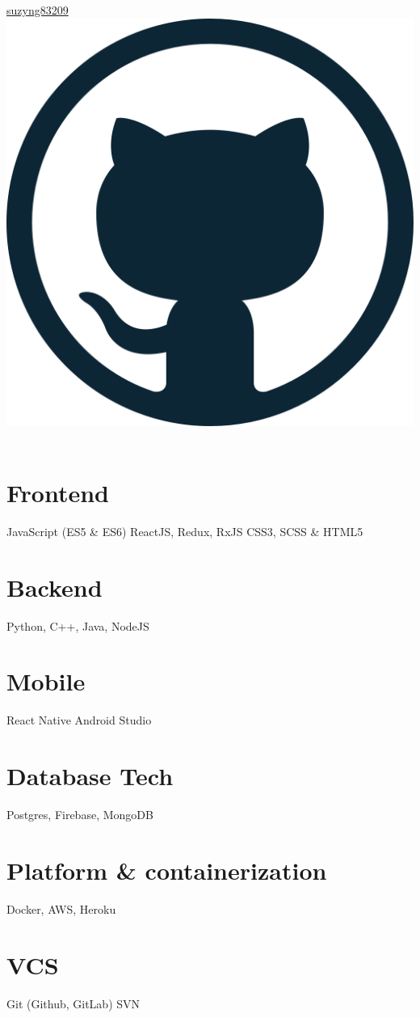 \documentclass[]{friggeri-cv}
\begin{document}
\begin{aside}
  \href{https://github.com/suzyng83209}{suzyng83209 \includegraphics[scale=0.02]{github-512.png}}
  \
  \
  \section{Frontend}
  JavaScript (ES5 \& ES6)
  ReactJS, Redux, RxJS
  CSS3, SCSS \& HTML5
  \section{Backend}
  Python, C++, Java, NodeJS
  \section{Mobile}
  React Native
  Android Studio
  \section{Database Tech}
  Postgres, Firebase, MongoDB
  \section{Platform \& containerization}
  Docker, AWS, Heroku
  \section{VCS}
  Git (Github, GitLab)
  SVN
\end{aside}
\end{document}

